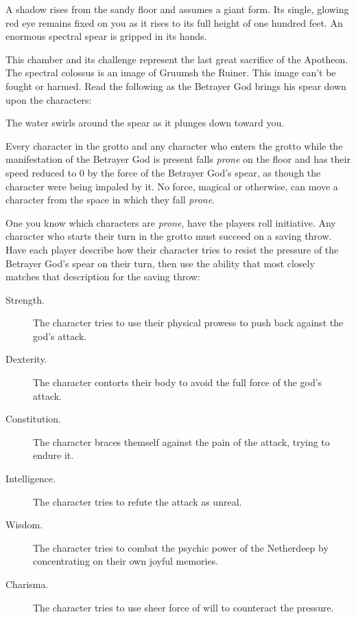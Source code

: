 \documentclass[a4paper, 11pt, bg=full, twocolumn, nooutline]{dndbook}
\begin{document}
\begin{DndReadAloud}
A shadow rises from the sandy floor and assumes a giant form. Its single, glowing red eye remains fixed on you as it rises to its full height of one hundred feet. An enormous spectral spear is gripped in its hands.
\end{DndReadAloud}

This chamber and its challenge represent the last great sacrifice of the Apotheon. The spectral colossus is an image of Gruumsh the Ruiner. This image can't be fought or harmed. Read the following as the Betrayer God brings his spear down upon the characters:

\begin{DndReadAloud}
The water swirls around the spear as it plunges down toward you.
\end{DndReadAloud}

Every character in the grotto and any character who enters the grotto while the manifestation of the Betrayer God is present falls \textit{prone} on the floor and has their speed reduced to 0 by the force of the Betrayer God's spear, as though the character were being impaled by it. No force, magical or otherwise, can move a character from the space in which they fall \textit{prone}.

One you know which characters are \textit{prone}, have the players roll initiative. Any character who starts their turn in the grotto must succeed on a saving throw. Have each player describe how their character tries to resist the pressure of the Betrayer God's spear on their turn, then use the ability that most closely matches that description for the saving throw:

\begin{description}
\item[Strength.] The character tries to use their physical prowess to push back against the god's attack.
\item[Dexterity.] The character contorts their body to avoid the full force of the god's attack.
\item[Constitution.] The character braces themself against the pain of the attack, trying to endure it.
\item[Intelligence.] The character tries to refute the attack as unreal.
\item[Wisdom.] The character tries to combat the psychic power of the Netherdeep by concentrating on their own joyful memories.
\item[Charisma.] The character tries to use sheer force of will to counteract the pressure.
\end{description}
\end{document}

